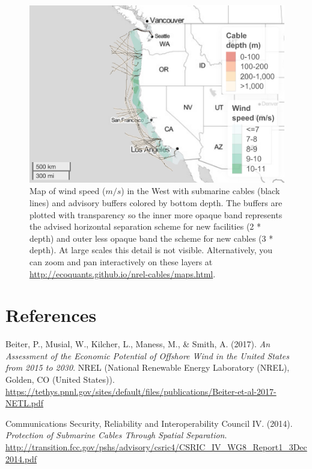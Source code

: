 \documentclass[]{article}
\begin{document}
\begin{figure}
\centering
\includegraphics{report_files/figure-latex/mapWindWest-1.pdf}
\caption{\label{fig:mapWindWest}Map of wind speed (\(m/s\)) in the West with
submarine cables (black lines) and advisory buffers colored by bottom
depth. The buffers are plotted with transparency so the inner more
opaque band represents the advised horizontal separation scheme for new
facilities (2 * depth) and outer less opaque band the scheme for new
cables (3 * depth). At large scales this detail is not visible.
Alternatively, you can zoom and pan interactively on these layers at
\url{http://ecoquants.github.io/nrel-cables/maps.html}.}
\end{figure}

\newpage

\hypertarget{references}{%
\section*{References}\label{references}}

\hypertarget{refs}{}
\leavevmode\hypertarget{ref-beiter_assessment_2017}{}%
Beiter, P., Musial, W., Kilcher, L., Maness, M., \& Smith, A. (2017).
\emph{An Assessment of the Economic Potential of Offshore Wind in the
United States from 2015 to 2030}. NREL (National Renewable Energy
Laboratory (NREL), Golden, CO (United States)).
\url{https://tethys.pnnl.gov/sites/default/files/publications/Beiter-et-al-2017-NETL.pdf}

\leavevmode\hypertarget{ref-communicationssecurityreliabilityandinteroperabilitycounciliv_protection_2014}{}%
Communications Security, Reliability and Interoperability Council IV.
(2014). \emph{Protection of Submarine Cables Through Spatial
Separation}.
\url{http://transition.fcc.gov/pshs/advisory/csric4/CSRIC_IV_WG8_Report1_3Dec2014.pdf}
\end{document}
